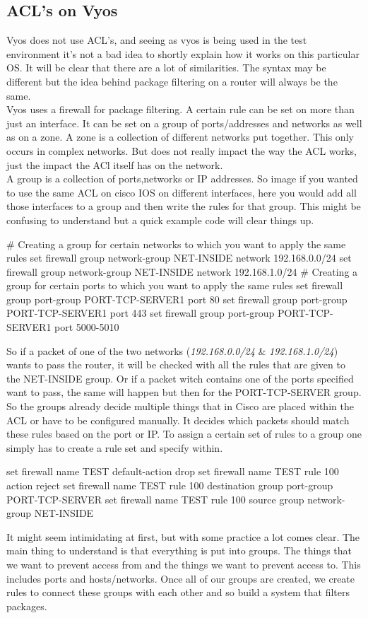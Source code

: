 \subsection{ACL's on Vyos}
Vyos does not use ACL's, and seeing as vyos is being used in the test environment it's not a bad idea to shortly explain how it works on this particular OS. It will be clear that there are a lot of similarities. The syntax may be different but the idea behind package filtering on a router will always be the same.\\
Vyos uses a firewall for package filtering. A certain rule can be set on more than just an interface. It can be set on a group of ports/addresses and networks as well as on a zone.
A zone is a collection of different networks put together. This only occurs in complex networks. But does not really impact the way the ACL works, just the impact the ACl itself has on the network.\\
A group is a collection of ports,networks or IP addresses. So image if you wanted to use the same ACL on cisco IOS on different interfaces, here you would add all those interfaces to a group and then write the rules for that group. This might be confusing to understand but a quick example code will clear things up.
\begin{cisco}[title=Creating firewall groups]
# Creating a group for certain networks to which you want to apply the same rules
set firewall group network-group NET-INSIDE network 192.168.0.0/24
set firewall group network-group NET-INSIDE network 192.168.1.0/24
# Creating a group for certain ports to which you want to apply the same rules
set firewall group port-group PORT-TCP-SERVER1 port 80
set firewall group port-group PORT-TCP-SERVER1 port 443
set firewall group port-group PORT-TCP-SERVER1 port 5000-5010
\end {cisco}
So if a packet of one of the two networks (\textit{192.168.0.0/24} \& \textit{192.168.1.0/24}) wants to pass the router, it will be checked with all the rules that are given to the NET-INSIDE group. Or if a packet witch contains one of the ports specified want to pass, the same will happen but then for the PORT-TCP-SERVER group. So the groups already decide multiple things that in Cisco are placed within the ACL or have to be configured manually. It decides which packets should match these rules based on the port or IP. To assign a certain set of rules to a group one simply has to create a rule set and specify within.
\begin{cisco}[title=Configuring a rule set]
set firewall name TEST default-action drop
set firewall name TEST rule 100 action reject
set firewall name TEST rule 100 destination group port-group PORT-TCP-SERVER
set firewall name TEST rule 100 source group network-group NET-INSIDE
\end{cisco}
It might seem intimidating at first, but with some practice a lot comes clear. The main thing to understand is that everything is put into groups. The things that we want to prevent access from and the things we want to prevent access to. This includes ports and hosts/networks. Once all of our groups are created, we create rules to connect these groups with each other and so build a system that filters packages.
